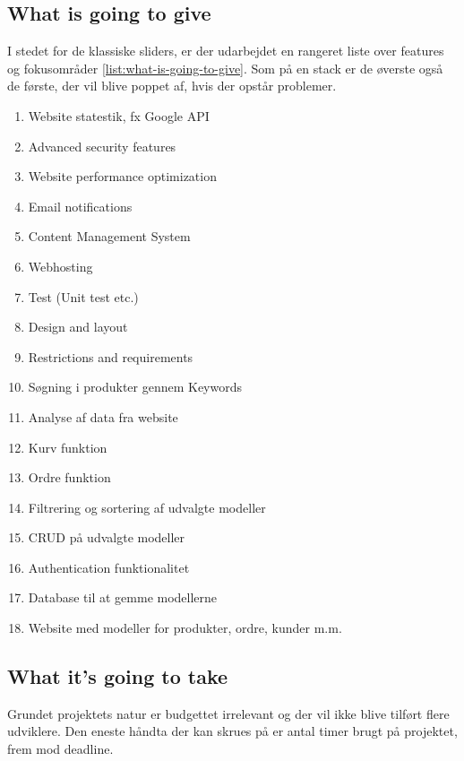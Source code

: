 \subsection{What is going to give}
I stedet for de klassiske sliders, er der udarbejdet en rangeret liste over features og fokusområder \ref{list:what-is-going-to-give}. 
Som på en stack er de øverste også de første, der vil blive poppet af, hvis der opstår problemer.
\begin{enumerate}[noitemsep]
    \item Website statestik, fx Google API
    \item Advanced security features
    \item Website performance optimization
    \item Email notifications
    \item Content Management System
    \item Webhosting
    \item Test (Unit test etc.)
    \item Design and layout
    \item Restrictions and requirements
    \item Søgning i produkter gennem Keywords
    \item Analyse af data fra website
    \item Kurv funktion
    \item Ordre funktion
    \item Filtrering og sortering af udvalgte modeller
    \item CRUD på udvalgte modeller
    \item Authentication funktionalitet
    \item Database til at gemme modellerne
    \item Website med modeller for produkter, ordre, kunder m.m.
    \label{list:what-is-going-to-give}
\end{enumerate}

\subsection{What it's going to take}
Grundet projektets natur er budgettet irrelevant og der vil ikke blive tilført flere udviklere.
Den eneste håndta der kan skrues på er antal timer brugt på projektet, frem mod deadline.